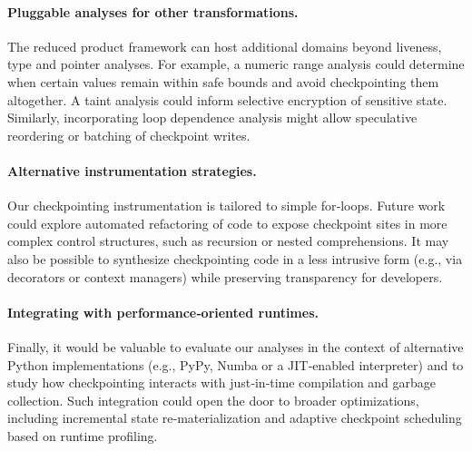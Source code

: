 \paragraph{Pluggable analyses for other transformations.} The reduced product framework can host additional domains beyond liveness, type and pointer analyses. For example, a numeric range analysis could determine when certain values remain within safe bounds and avoid checkpointing them altogether. A taint analysis could inform selective encryption of sensitive state. Similarly, incorporating loop dependence analysis might allow speculative reordering or batching of checkpoint writes.

\paragraph{Alternative instrumentation strategies.} Our checkpointing instrumentation is tailored to simple for‑loops. Future work could explore automated refactoring of code to expose checkpoint sites in more complex control structures, such as recursion or nested comprehensions. It may also be possible to synthesize checkpointing code in a less intrusive form (e.g., via decorators or context managers) while preserving transparency for developers.

\paragraph{Integrating with performance‑oriented runtimes.} Finally, it would be valuable to evaluate our analyses in the context of alternative Python implementations (e.g., PyPy, Numba or a JIT‑enabled interpreter) and to study how checkpointing interacts with just‑in‑time compilation and garbage collection. Such integration could open the door to broader optimizations, including incremental state re‑materialization and adaptive checkpoint scheduling based on runtime profiling.
